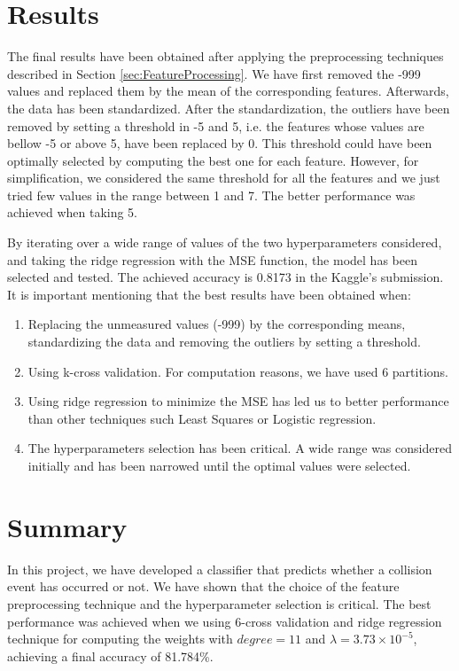 \documentclass[10pt,conference,compsocconf]{IEEEtran}
\begin{document}
 
\section{Results}
\label{sec:Results}
The final results have been obtained after applying the preprocessing techniques described in Section \ref{sec:FeatureProcessing}. We have first removed the -999 values and replaced them by the mean of the corresponding features. Afterwards, the data has been standardized. After the standardization, the outliers have been removed by setting a threshold in -5 and 5, i.e. the features whose values are bellow -5 or above 5, have been replaced by 0. This threshold could have been optimally selected by computing the best one for each feature. However, for simplification, we considered the same threshold for all the features and we just tried few values in the range between 1 and 7. The better performance was achieved when taking 5. 

By iterating over a wide range of values of the two hyperparameters considered, and taking the ridge regression with the MSE function, the model has been selected and tested. The achieved accuracy is 0.8173 in the Kaggle's submission. It is important mentioning that the best results have been obtained when:
\begin{enumerate}
    \item Replacing the unmeasured values (-999) by the corresponding means, standardizing the data and removing the outliers by setting a threshold.
\item Using k-cross validation. For computation reasons, we have used 6 partitions.
\item Using ridge regression to minimize the MSE has led us to better performance than other techniques such Least Squares or Logistic regression.
\item The hyperparameters selection has been critical. A wide range was considered initially and has been narrowed until the optimal values were selected. 
\end{enumerate}


\section{Summary} %
\label{sec:Summary}
In this project, we have developed a classifier that predicts whether a collision event has occurred or not. We have shown that the choice of the feature preprocessing technique and the hyperparameter selection is critical. The best performance was achieved when we using 6-cross validation and ridge regression technique for computing the weights with $degree=11$ and $\lambda=3.73\times10^{-5}$, achieving a final accuracy of 81.784\%.



\end{document}
